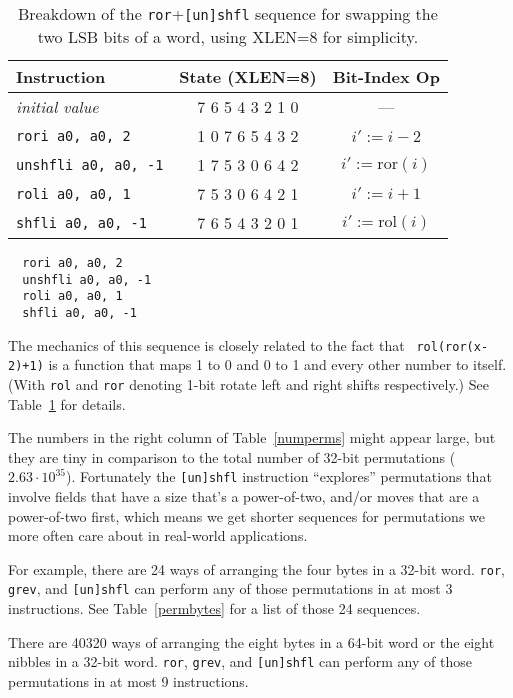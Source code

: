 \begin{table}[t]
\begin{center}
\begin{tabular}{l|c|c}
Instruction & State (XLEN=8) & Bit-Index Op \\
\hline
{\it initial value}      & 7 6 5 4 3 2 1 0 & --- \\
{\tt rori a0, a0, 2}     & 1 0 7 6 5 4 3 2 & $i' := i-2$ \\
{\tt unshfli a0, a0, -1} & 1 7 5 3 0 6 4 2 & $i' := \mathrm{ror}(i)$ \\
{\tt roli a0, a0, 1}     & 7 5 3 0 6 4 2 1 & $i' := i+1$ \\
{\tt shfli a0, a0, -1}   & 7 6 5 4 3 2 0 1 & $i' := \mathrm{rol}(i)$ \\
\end{tabular}
\end{center}
\caption{Breakdown of the {\tt ror}+{\tt [un]shfl} sequence for swapping the
two LSB bits of a word, using XLEN=8 for simplicity.}
\label{permdemo}
\end{table}

\begin{minipage}{\linewidth}
\begin{verbatim}
  rori a0, a0, 2
  unshfli a0, a0, -1
  roli a0, a0, 1
  shfli a0, a0, -1
\end{verbatim}
\end{minipage}

The mechanics of this sequence is closely related to the fact that {\tt
rol(ror(x-2)+1)} is a function that maps 1 to 0 and 0 to 1 and every other
number to itself. (With {\tt rol} and {\tt ror} denoting 1-bit rotate left and
right shifts respectively.) See Table~\ref{permdemo} for details.

The numbers in the right column of Table~\ref{numperms} might appear large,
but they are tiny in comparison to the total number of 32-bit permutations
($2.63\cdot10^{35}$). Fortunately the {\tt [un]shfl} instruction ``explores''
permutations that involve fields that have a size that's a power-of-two,
and/or moves that are a power-of-two first, which means we get shorter sequences
for permutations we more often care about in real-world applications.

For example, there are 24 ways of arranging the four bytes in a 32-bit word.
{\tt ror}, {\tt grev}, and {\tt [un]shfl} can perform any of those permutations
in at most 3 instructions. See Table~\ref{permbytes} for a list of those 24
sequences.

There are 40320 ways of arranging the eight bytes in a 64-bit word or the eight
nibbles in a 32-bit word. {\tt ror}, {\tt grev}, and {\tt [un]shfl} can perform
any of those permutations in at most 9 instructions.~\cite{Wolf19A}


